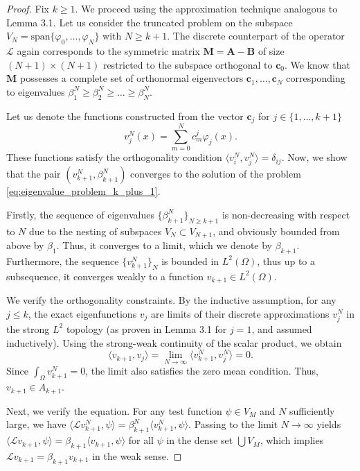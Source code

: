 \documentclass[11pt, a4paper]{article}
\theoremstyle{break}
\theoremstyle{break}
\theoremstyle{break}
\theoremstyle{break}
\theoremstyle{break}
\theoremstyle{break}
\theoremstyle{break}
\theoremstyle{break}
\theoremstyle{break}
\begin{document}
\begin{proof}
    Fix $k \geq 1$. We proceed using the approximation technique analogous to Lemma 3.1. Let us consider the truncated problem on the subspace $V_N = \text{span}\{\varphi_0, \ldots, \varphi_N\}$ with $N \geq k+1$. The discrete counterpart of the operator $\mathcal{L}$ again corresponds to the symmetric matrix $\mathbf{M} = \mathbf{A} - \mathbf{B}$ of size $(N+1) \times (N+1)$ restricted to the subspace orthogonal to $\mathbf{c}_0$. We know that $\mathbf{M}$ possesses a complete set of orthonormal eigenvectors $\mathbf{c}_1, \ldots, \mathbf{c}_N$ corresponding to eigenvalues $\beta_1^N \geq \beta_2^N \geq \ldots \geq \beta_N^N$. 
    
    Let us denote the functions constructed from the vector $\mathbf{c}_j$ for $j \in \{1, \ldots, k+1\}$
    \begin{equation}
        v_j^N(x) = \sum_{m=0}^N c^j_m \varphi_j(x).
    \end{equation}
    These functions satisfy the orthogonality condition $\langle v_i^N, v_j^N \rangle = \delta_{ij}$. Now, we show that the pair $(v_{k+1}^N, \beta_{k+1}^N)$ converges to the solution of the problem \eqref{eq:eigenvalue_problem_k_plus_1}.
    
    Firstly, the sequence of eigenvalues $\{\beta_{k+1}^N\}_{N \geq k+1}$ is non-decreasing with respect to $N$ due to the nesting of subspaces $V_N \subset V_{N+1}$, and obviously bounded from above by $\beta_1$. Thus, it converges to a limit, which we denote by $\beta_{k+1}$. Furthermore, the sequence $\{v_{k+1}^N\}_{N}$ is bounded in $L^2(\Omega)$, thus up to a subsequence, it converges weakly to a function $v_{k+1} \in L^2(\Omega)$.
    
    We verify the orthogonality constraints. By the inductive assumption, for any $j \leq k$, the exact eigenfunctions $v_j$ are limits of their discrete approximations $v_j^N$ in the strong $L^2$ topology (as proven in Lemma 3.1 for $j=1$, and assumed inductively). Using the strong-weak continuity of the scalar product, we obtain
    \begin{equation}
        \langle v_{k+1}, v_j \rangle = \lim_{N \to \infty} \langle v_{k+1}^N, v_j^N \rangle = 0.
    \end{equation}
    Since $\int_\Omega v_{k+1}^N = 0$, the limit also satisfies the zero mean condition. Thus, $v_{k+1} \in A_{k+1}$.
    
    Next, we verify the equation. For any test function $\psi \in V_M$ and $N$ sufficiently large, we have $\langle \mathcal{L} v_{k+1}^N, \psi \rangle = \beta_{k+1}^N \langle v_{k+1}^N, \psi \rangle$. Passing to the limit $N \to \infty$ yields $\langle \mathcal{L} v_{k+1}, \psi \rangle = \beta_{k+1} \langle v_{k+1}, \psi \rangle$ for all $\psi$ in the dense set $\bigcup V_M$, which implies $\mathcal{L} v_{k+1} = \beta_{k+1} v_{k+1}$ in the weak sense.
    

\end{proof}
\end{document}
